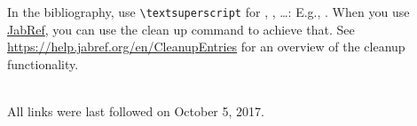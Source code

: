 \documentclass[english,runningheads,a4paper]{llncs}[2018/03/10]
\begin{document}
In the bibliography, use \texttt{\textbackslash textsuperscript} for , , \ldots:
E.g., .
When you use \href{https://www.jabref.org}{JabRef}, you can use the clean up command to achieve that.
See \url{https://help.jabref.org/en/CleanupEntries} for an overview of the cleanup functionality.

\renewcommand{\bibsection}{\section*{References}} %

\begingroup
  \ifluatex
  \else
  \fi
  \small %
  
\endgroup

\ \\
%
All links were last followed on October 5, 2017.
\end{document}
